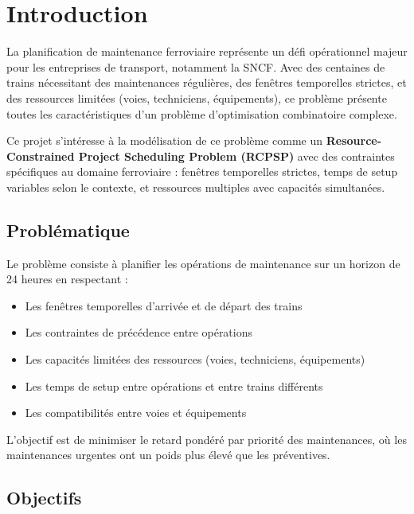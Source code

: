 \section{Introduction}

La planification de maintenance ferroviaire représente un défi opérationnel majeur pour les entreprises de transport, notamment la SNCF. Avec des centaines de trains nécessitant des maintenances régulières, des fenêtres temporelles strictes, et des ressources limitées (voies, techniciens, équipements), ce problème présente toutes les caractéristiques d'un problème d'optimisation combinatoire complexe.

Ce projet s'intéresse à la modélisation de ce problème comme un \textbf{Resource-Constrained Project Scheduling Problem (RCPSP)} avec des contraintes spécifiques au domaine ferroviaire : fenêtres temporelles strictes, temps de setup variables selon le contexte, et ressources multiples avec capacités simultanées.

\subsection{Problématique}

Le problème consiste à planifier les opérations de maintenance sur un horizon de 24 heures en respectant :
\begin{itemize}
    \item Les fenêtres temporelles d'arrivée et de départ des trains
    \item Les contraintes de précédence entre opérations
    \item Les capacités limitées des ressources (voies, techniciens, équipements)
    \item Les temps de setup entre opérations et entre trains différents
    \item Les compatibilités entre voies et équipements
\end{itemize}

L'objectif est de minimiser le retard pondéré par priorité des maintenances, où les maintenances urgentes ont un poids plus élevé que les préventives.

\subsection{Objectifs}

